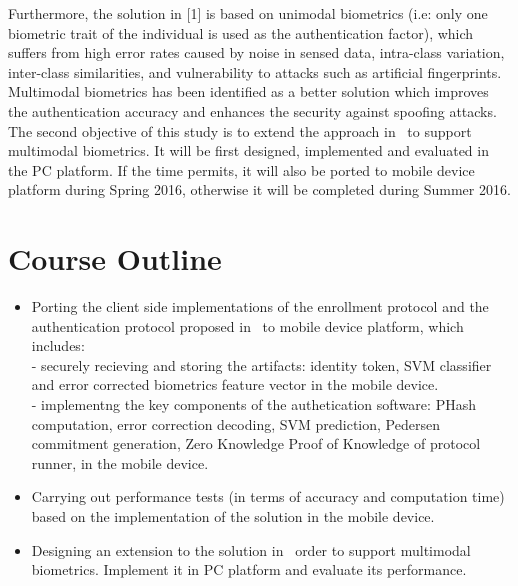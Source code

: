 \documentclass[a4paper,10pt]{article}
\begin{document}
Furthermore, the solution in [1] is based on unimodal biometrics (i.e: only one biometric trait of the individual is used as the authentication
factor), which suffers from high error rates caused by noise in sensed data, intra-class variation, inter-class similarities, and vulnerability
to attacks such as artificial fingerprints. Multimodal biometrics has been identified as a better solution which improves the authentication
accuracy and enhances the security against spoofing attacks. The second objective of this study is to extend the approach in~\cite{ours} to 
support multimodal biometrics. It will be first designed, implemented and evaluated in the PC platform. If the time permits, it will also be 
ported to mobile device platform during Spring 2016, otherwise it will be completed during Summer 2016.


\section{Course Outline}
\begin{itemize}
 \item Porting the client side implementations of the enrollment protocol and the authentication protocol proposed in~\cite{ours} to mobile 
 device platform, which includes:\\
  - securely recieving and storing the artifacts: identity token, SVM classifier and error corrected biometrics feature vector in the 
  mobile device.\\
  - implementng the key components of the authetication software: PHash computation, error correction decoding, SVM prediction, 
  Pedersen commitment generation, Zero Knowledge Proof of Knowledge of protocol runner, in the mobile device.
  \item Carrying out performance tests (in terms of accuracy and computation time) based on the implementation of the solution 
  in the mobile device.
  \item Designing an extension to the solution in~\cite{ours} order to support multimodal biometrics. Implement it in PC platform and evaluate its performance.
\end{itemize}




\end{document}
